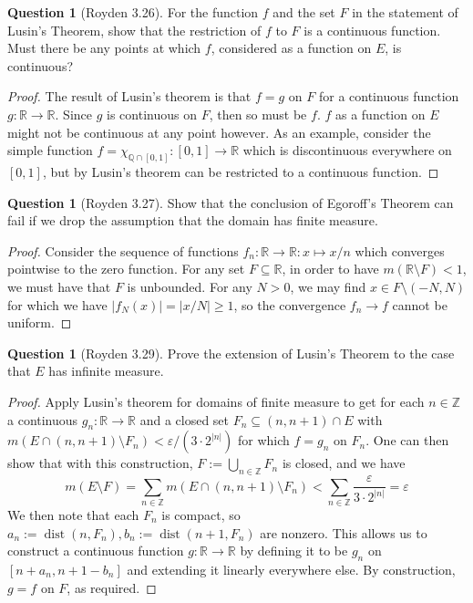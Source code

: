\documentclass{article}
\newcommand{\Z}{\mathbb{Z}}
\newcommand{\Q}{\mathbb{Q}}
\newcommand{\R}{\mathbb{R}}
\theoremstyle{definition} %
\numberwithin{thm}{section} %
\theoremstyle{definition} %
\newtheorem{question}[thm]{Question}
\begin{document}
\begin{question}[Royden 3.26]
For the function $f$ and the set $F$ in the statement of Lusin's Theorem, show that the restriction of $f$ to $F$ is a continuous function. Must there be any points at which $f$, considered as a function on $E$, is continuous?
\end{question}
\begin{proof}
The result of Lusin's theorem is that $f = g$ on $F$ for a continuous function $g: \R \to \R$. Since $g$ is continuous on $F$, then so must be $f$. $f$ as a function on $E$ might not be continuous at any point however. As an example, consider the simple function $f = \chi_{\Q \cap [0, 1]}: [0, 1] \to \R$ which is discontinuous everywhere on $[0, 1]$, but by Lusin's theorem can be restricted to a continuous function.
\end{proof}

\begin{question}[Royden 3.27]
Show that the conclusion of Egoroff's Theorem can fail if we drop the assumption that the domain has finite measure.
\end{question}
\begin{proof}
Consider the sequence of functions $f_n: \R \to \R: x \mapsto x/n$ which converges pointwise to the zero function. For any set $F \subseteq \R$, in order to have $m(\R \setminus F) < 1$, we must have that $F$ is unbounded. For any $N > 0$, we may find $x \in F \setminus (-N, N)$ for which we have $|f_N(x)| = |x/N| \geq 1$, so the convergence $f_n \to f$ cannot be uniform.
\end{proof}

\begin{question}[Royden 3.29]
Prove the extension of Lusin's Theorem to the case that $E$ has infinite measure.
\end{question}
\begin{proof}
Apply Lusin's theorem for domains of finite measure to get for each $n \in \Z$ a continuous $g_n: \R \to \R$ and a closed set $F_n \subseteq (n, n + 1) \cap E$ with $m(E \cap (n, n + 1) \setminus F_n) < \varepsilon/(3 \cdot 2^{|n|})$ for which $f = g_n$ on $F_n$. One can then show that with this construction, $F := \bigcup_{n \in \Z} F_n$ is closed, and we have 
\[ m(E \setminus F) = \sum_{n \in \Z} m(E \cap (n, n + 1) \setminus F_n) < \sum_{n \in \Z} \frac{\varepsilon}{3 \cdot 2^{|n|}} = \varepsilon \]
We then note that each $F_n$ is compact, so $a_n := \operatorname{dist}(n, F_n), b_n := \operatorname{dist}(n + 1, F_n)$ are nonzero. This allows us to construct a continuous function $g: \R \to \R$ by defining it to be $g_n$ on $[n + a_n, n + 1 - b_n]$ and extending it linearly everywhere else. By construction, $g = f$ on $F$, as required.
\end{proof}
\end{document}
